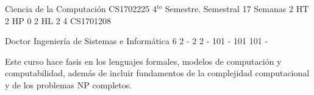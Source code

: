 \documentclass[a4paper,8pt]{article}
\begin{document}
\setNombreProfesor{}
\setGradoProfesorAbreviado{}
\sylabusHeader

\academicaTable
{Ciencia de la Computación} %
{CS1702225} %
{4$^{to}$ Semestre.} %
{Semestral} %
{17 Semanas} %
{2 HT} %
{2 HP} %
{0} %
{2 HL}  %
{2} %
{4} %
{CS1701208} %

\administrativaTable
{Doctor} %
{Ingeniería de Sistemas e Informática} %
{6} %
{2} %
{-} %
{2} %
{2} %
{-} %
{101} %
{-} %
{101} %
{101} %
{-} %


\begin{fundamentacion}
Este curso hace fasis en los lenguajes formales, modelos de computación y computabilidad, además de incluir fundamentos de la complejidad computacional y de los problemas NP completos.

\end{fundamentacion}

\begin{sumilla}
\item \ALBasicAutomataComputabilityandComplexity
\item \ALAdvancedComputationalComplexity
\item \ALAdvancedAutomataTheoryandComputability

\end{sumilla}

\begin{competenciasAsignatura}
\item {}
\item {}

\end{competenciasAsignatura}
\end{document}
